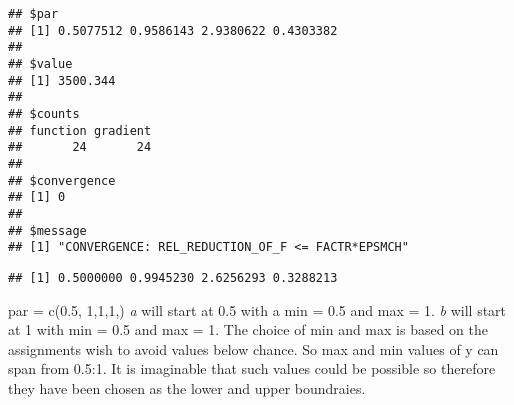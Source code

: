 \documentclass[
]{article}
\newenvironment{Shaded}{\begin{snugshade}}{\end{snugshade}}
\newcommand{\AttributeTok}[1]{\textcolor[rgb]{0.77,0.63,0.00}{#1}}
\newcommand{\CommentTok}[1]{\textcolor[rgb]{0.56,0.35,0.01}{\textit{#1}}}
\newcommand{\ConstantTok}[1]{\textcolor[rgb]{0.00,0.00,0.00}{#1}}
\newcommand{\DecValTok}[1]{\textcolor[rgb]{0.00,0.00,0.81}{#1}}
\newcommand{\FloatTok}[1]{\textcolor[rgb]{0.00,0.00,0.81}{#1}}
\newcommand{\FunctionTok}[1]{\textcolor[rgb]{0.00,0.00,0.00}{#1}}
\newcommand{\NormalTok}[1]{#1}
\newcommand{\OtherTok}[1]{\textcolor[rgb]{0.56,0.35,0.01}{#1}}
\newcommand{\SpecialCharTok}[1]{\textcolor[rgb]{0.00,0.00,0.00}{#1}}
\newcommand{\StringTok}[1]{\textcolor[rgb]{0.31,0.60,0.02}{#1}}
\begin{document}
\begin{verbatim}
## $par
## [1] 0.5077512 0.9586143 2.9380622 0.4303382
## 
## $value
## [1] 3500.344
## 
## $counts
## function gradient 
##       24       24 
## 
## $convergence
## [1] 0
## 
## $message
## [1] "CONVERGENCE: REL_REDUCTION_OF_F <= FACTR*EPSMCH"
\end{verbatim}

\begin{Shaded}
\end{Shaded}

\begin{verbatim}
## [1] 0.5000000 0.9945230 2.6256293 0.3288213
\end{verbatim}

par = c(0.5, 1,1,1,) \emph{a} will start at 0.5 with a min = 0.5 and max
= 1. \emph{b} will start at 1 with min = 0.5 and max = 1. The choice of
min and max is based on the assignments wish to avoid values below
chance. So max and min values of y can span from 0.5:1. It is imaginable
that such values could be possible so therefore they have been chosen as
the lower and upper boundraies.
\end{document}
